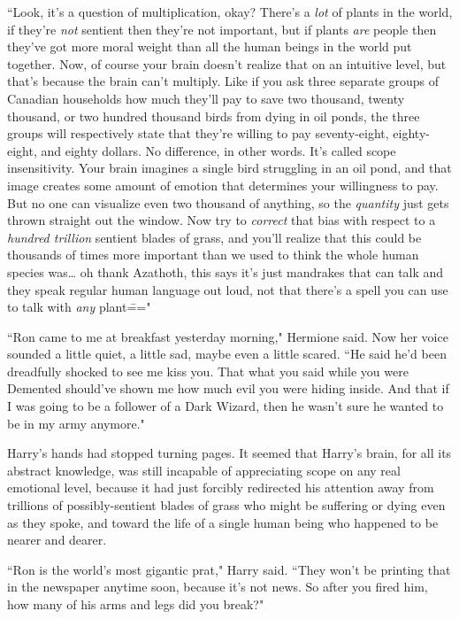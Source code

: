 ``Look, it's a question of multiplication, okay? There's a \emph{lot} of plants in the world, if they're \emph{not} sentient then they're not important, but if plants \emph{are} people then they've got more moral weight than all the human beings in the world put together. Now, of course your brain doesn't realize that on an intuitive level, but that's because the brain can't multiply. Like if you ask three separate groups of Canadian households how much they'll pay to save two thousand, twenty thousand, or two hundred thousand birds from dying in oil ponds, the three groups will respectively state that they're willing to pay seventy-eight, eighty-eight, and eighty dollars. No difference, in other words. It's called scope insensitivity. Your brain imagines a single bird struggling in an oil pond, and that image creates some amount of emotion that determines your willingness to pay. But no one can visualize even two thousand of anything, so the \emph{quantity} just gets thrown straight out the window. Now try to \emph{correct} that bias with respect to a \emph{hundred trillion} sentient blades of grass, and you'll realize that this could be thousands of times more important than we used to think the whole human species was{\ldots} oh thank Azathoth, this says it's just mandrakes that can talk and they speak regular human language out loud, not that there's a spell you can use to talk with \emph{any} plant\==="

``Ron came to me at breakfast yesterday morning," Hermione said. Now her voice sounded a little quiet, a little sad, maybe even a little scared. ``He said he'd been dreadfully shocked to see me kiss you. That what you said while you were Demented should've shown me how much evil you were hiding inside. And that if I was going to be a follower of a Dark Wizard, then he wasn't sure he wanted to be in my army anymore."

Harry's hands had stopped turning pages. It seemed that Harry's brain, for all its abstract knowledge, was still incapable of appreciating scope on any real emotional level, because it had just forcibly redirected his attention away from trillions of possibly-sentient blades of grass who might be suffering or dying even as they spoke, and toward the life of a single human being who happened to be nearer and dearer.

``Ron is the world's most gigantic prat," Harry said. ``They won't be printing that in the newspaper anytime soon, because it's not news. So after you fired him, how many of his arms and legs did you break?"

